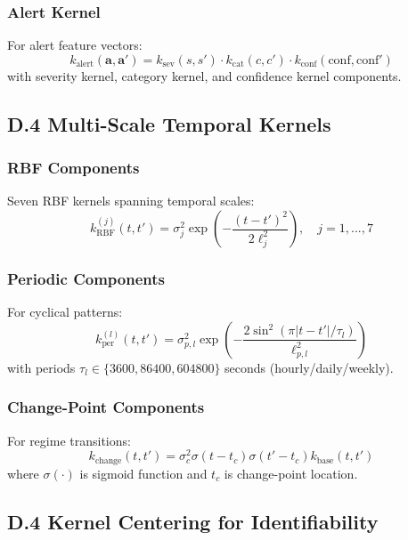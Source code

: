 \documentclass[12pt]{article}
\begin{document}
\subsubsection{Alert Kernel}
For alert feature vectors:
\begin{equation}
k_{\text{alert}}(\mathbf{a}, \mathbf{a'}) = k_{\text{sev}}(s, s') \cdot k_{\text{cat}}(c, c') \cdot k_{\text{conf}}(\text{conf}, \text{conf}')
\end{equation}
with severity kernel, category kernel, and confidence kernel components.

\subsection{D.4 Multi-Scale Temporal Kernels}

\subsubsection{RBF Components}
Seven RBF kernels spanning temporal scales:
\begin{equation}
k_{\mathrm{RBF}}^{(j)}(t,t') = \sigma_j^2 \exp\left(-\frac{(t-t')^2}{2\ell_j^2}\right), \quad j=1,...,7
\end{equation}

\subsubsection{Periodic Components}
For cyclical patterns:
\begin{equation}
k_{\mathrm{per}}^{(l)}(t,t') = \sigma_{p,l}^2 \exp\left(-\frac{2\sin^2(\pi|t-t'|/\tau_l)}{\ell_{p,l}^2}\right)
\end{equation}
with periods $\tau_l \in \{3600, 86400, 604800\}$ seconds (hourly/daily/weekly).

\subsubsection{Change-Point Components}
For regime transitions:
\begin{equation}
k_{\mathrm{change}}(t,t') = \sigma_c^2 \sigma(t-t_c) \sigma(t'-t_c) k_{\mathrm{base}}(t,t')
\end{equation}
where $\sigma(\cdot)$ is sigmoid function and $t_c$ is change-point location.

\subsection{D.4 Kernel Centering for Identifiability}
\end{document}
